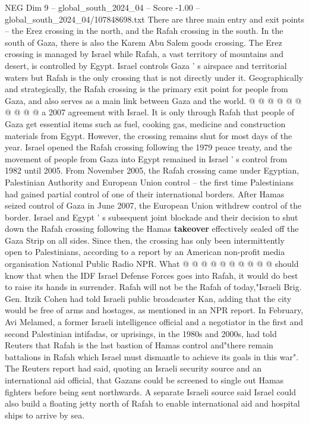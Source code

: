 \begin{textsample}{NEG Dim 9 – global\_south\_2024\_04 – Score -1.00 – global\_south\_2024\_04/107848698.txt}
There are three main entry and exit points -- the Erez crossing in the north, and the Rafah crossing in the south.
In the south of Gaza, there is also the Karem Abu Salem goods crossing.
The Erez crossing is managed by Israel while Rafah, a vast territory of mountains and desert, is controlled by Egypt.
Israel controls Gaza ' s airspace and territorial waters but Rafah is the only crossing that is not directly under it.
Geographically and strategically, the Rafah crossing is the primary exit point for people from Gaza, and also serves as a main link between Gaza and the world. @ @ @ @ @ @ @ @ @ @ a 2007 agreement with Israel.
It is only through Rafah that people of Gaza get essential items such as fuel, cooking gas, medicine and construction materials from Egypt.
However, the crossing remains shut for most days of the year.
Israel opened the Rafah crossing following the 1979 peace treaty, and the movement of people from Gaza into Egypt remained in Israel ' s control from 1982 until 2005.
From November 2005, the Rafah crossing came under Egyptian, Palestinian Authority and European Union control -- the first time Palestinians had gained partial control of one of their international borders.
After Hamas seized control of Gaza in June 2007, the European Union withdrew control of the border.
Israel and Egypt ' s subsequent joint blockade and their decision to shut down the Rafah crossing following the Hamas \textbf{takeover} effectively sealed off the Gaza Strip on all sides.
Since then, the crossing has only been intermittently open to Palestinians, according to a report by an American non-profit media organisation National Public Radio NPR.
What @ @ @ @ @ @ @ @ @ @ should know that when the IDF Israel Defense Forces goes into Rafah, it would do best to raise its hands in surrender.
Rafah will not be the Rafah of today,"Israeli Brig.
Gen.
Itzik Cohen had told Israeli public broadcaster Kan, adding that the city would be free of arms and hostages, as mentioned in an NPR report.
In February, Avi Melamed, a former Israeli intelligence official and a negotiator in the first and second Palestinian intifadas, or uprisings, in the 1980s and 2000s, had told Reuters that Rafah is the last bastion of Hamas control and"there remain battalions in Rafah which Israel must dismantle to achieve its goals in this war".
The Reuters report had said, quoting an Israeli security source and an international aid official, that Gazans could be screened to single out Hamas fighters before being sent northwards.
A separate Israeli source said Israel could also build a floating jetty north of Rafah to enable international aid and hospital ships to arrive by sea.

\end{textsample}
